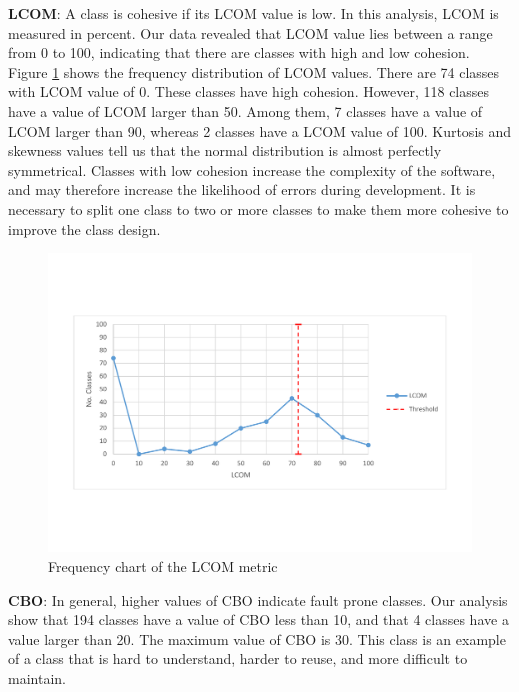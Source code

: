 \textbf{LCOM}: A class is cohesive if its LCOM value is low. In this analysis, LCOM is measured in percent. Our data revealed that LCOM value lies between a range from 0 to 100, indicating that there are classes with high and low cohesion. Figure \ref{fig:lcomdistribution} shows the frequency distribution of LCOM values. There are 74 classes with LCOM value of 0. These classes have high cohesion. However, 118 classes have a value of LCOM larger than 50. Among them, 7 classes have a value of LCOM larger than 90, whereas 2 classes have a LCOM value of 100. Kurtosis and skewness values tell us that the normal distribution is almost perfectly symmetrical. Classes with low cohesion increase the complexity of the software, and may therefore increase the likelihood of errors during development. It is necessary to split one class to two or more classes to make them more cohesive to improve the class design.


\begin{figure}
	\centering
	\includegraphics[width=\textwidth]{images/threshold/lcom.pdf}
	\caption{Frequency chart of the LCOM metric}
	\label{fig:lcomdistribution}
\end{figure}



\textbf{CBO}: In general, higher values of CBO indicate fault prone classes. Our analysis show that 194 classes have a value of CBO less than 10, and that 4 classes have a value larger than 20. The maximum value of CBO is 30. This class is an example of a class that is hard to understand, harder to reuse, and more difficult to maintain. 


